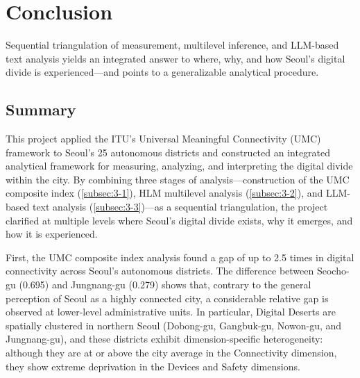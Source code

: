 \section{Conclusion}
\label{sec:conclusion}


\begin{quoteblock}
Sequential triangulation of measurement, multilevel inference, and LLM-based text analysis yields an integrated answer to where, why, and how Seoul's digital divide is experienced---and points to a generalizable analytical procedure.
\end{quoteblock}

\subsection{Summary}
\label{subsec:5-1}

This project applied the ITU's Universal Meaningful Connectivity (UMC) framework to Seoul's 25 autonomous districts and constructed an integrated analytical framework for measuring, analyzing, and interpreting the digital divide within the city. By combining three stages of analysis---construction of the UMC composite index (\ref{subsec:3-1}), HLM multilevel analysis (\ref{subsec:3-2}), and LLM-based text analysis (\ref{subsec:3-3})---as a sequential triangulation, the project clarified at multiple levels where Seoul's digital divide exists, why it emerges, and how it is experienced.

First, the UMC composite index analysis found a gap of up to 2.5 times in digital connectivity across Seoul's autonomous districts. The difference between Seocho-gu (0.695) and Jungnang-gu (0.279) shows that, contrary to the general perception of Seoul as a highly connected city, a considerable relative gap is observed at lower-level administrative units. In particular, Digital Deserts are spatially clustered in northern Seoul (Dobong-gu, Gangbuk-gu, Nowon-gu, and Jungnang-gu), and these districts exhibit dimension-specific heterogeneity: although they are at or above the city average in the Connectivity dimension, they show extreme deprivation in the Devices and Safety dimensions.


